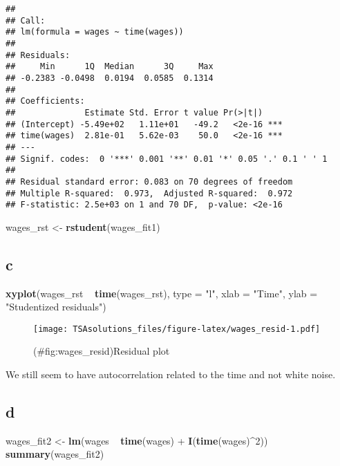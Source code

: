 \documentclass[]{book}
\newenvironment{Shaded}{\begin{snugshade}}{\end{snugshade}}
\newcommand{\KeywordTok}[1]{\textcolor[rgb]{0.13,0.29,0.53}{\textbf{{#1}}}}
\newcommand{\DataTypeTok}[1]{\textcolor[rgb]{0.13,0.29,0.53}{{#1}}}
\newcommand{\DecValTok}[1]{\textcolor[rgb]{0.00,0.00,0.81}{{#1}}}
\newcommand{\StringTok}[1]{\textcolor[rgb]{0.31,0.60,0.02}{{#1}}}
\newcommand{\NormalTok}[1]{{#1}}
\theoremstyle{definition}
\theoremstyle{definition}
\theoremstyle{remark}
\begin{document}
\begin{verbatim}
## 
## Call:
## lm(formula = wages ~ time(wages))
## 
## Residuals:
##     Min      1Q  Median      3Q     Max 
## -0.2383 -0.0498  0.0194  0.0585  0.1314 
## 
## Coefficients:
##              Estimate Std. Error t value Pr(>|t|)    
## (Intercept) -5.49e+02   1.11e+01   -49.2   <2e-16 ***
## time(wages)  2.81e-01   5.62e-03    50.0   <2e-16 ***
## ---
## Signif. codes:  0 '***' 0.001 '**' 0.01 '*' 0.05 '.' 0.1 ' ' 1
## 
## Residual standard error: 0.083 on 70 degrees of freedom
## Multiple R-squared:  0.973,  Adjusted R-squared:  0.972 
## F-statistic: 2.5e+03 on 1 and 70 DF,  p-value: <2e-16
\end{verbatim}

\begin{Shaded}
\begin{Highlighting}[]
\NormalTok{wages_rst <-}\StringTok{ }\KeywordTok{rstudent}\NormalTok{(wages_fit1)}
\end{Highlighting}
\end{Shaded}

\subsection*{c}\label{c-11}

\begin{Shaded}
\begin{Highlighting}[]
\KeywordTok{xyplot}\NormalTok{(wages_rst ~}\StringTok{ }\KeywordTok{time}\NormalTok{(wages_rst), }\DataTypeTok{type =} \StringTok{"l"}\NormalTok{,}
       \DataTypeTok{xlab =} \StringTok{"Time"}\NormalTok{, }\DataTypeTok{ylab =} \StringTok{"Studentized residuals"}\NormalTok{)}
\end{Highlighting}
\end{Shaded}

\begin{figure}[htbp]
\centering
\texttt{[image: TSAsolutions\_files/figure-latex/wages\_resid-1.pdf]}
\caption{(\#fig:wages\_resid)Residual plot}
\end{figure}

We still seem to have autocorrelation related to the time and not white
noise.

\subsection*{d}\label{d-2}

\begin{Shaded}
\begin{Highlighting}[]
\NormalTok{wages_fit2 <-}\StringTok{ }\KeywordTok{lm}\NormalTok{(wages ~}\StringTok{ }\KeywordTok{time}\NormalTok{(wages) +}\StringTok{ }\KeywordTok{I}\NormalTok{(}\KeywordTok{time}\NormalTok{(wages)^}\DecValTok{2}\NormalTok{))}
\KeywordTok{summary}\NormalTok{(wages_fit2)}
\end{Highlighting}
\end{Shaded}
\end{document}
